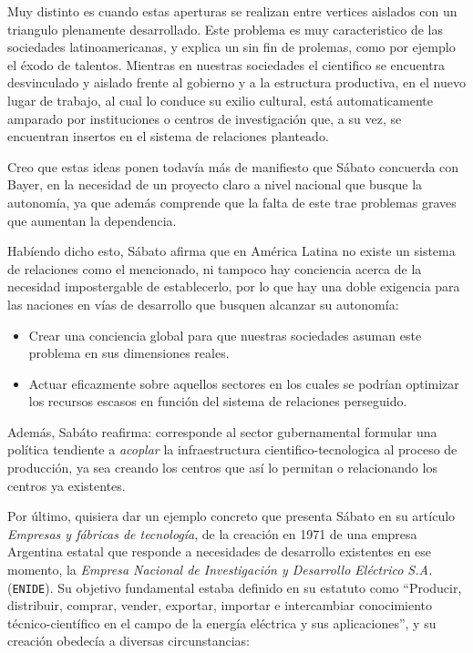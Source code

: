 Muy distinto es cuando estas aperturas se realizan entre vertices aislados con un triangulo plenamente desarrollado. Este problema es muy caracteristico de las sociedades latinoamericanas, y explica un sin fin de prolemas, como por ejemplo el éxodo de talentos. Mientras en nuestras sociedades el cientifico se encuentra desvinculado y aislado frente al gobierno y a la estructura productiva, en el nuevo lugar de trabajo, al cual lo conduce su exilio cultural, está automaticamente amparado por instituciones o centros de investigación que, a su vez, se encuentran insertos en el sistema de relaciones planteado.

Creo que estas ideas ponen todavía más de manifiesto que Sábato concuerda con Bayer, en la necesidad de un proyecto claro a nivel nacional que busque la autonomía, ya que además comprende que la falta de este trae problemas graves que aumentan la dependencia.

\vspace{0.5em}

Habíendo dicho esto, Sábato afirma que en América Latina no existe un sistema de relaciones como el mencionado, ni tampoco hay conciencia acerca de la necesidad impostergable de establecerlo, por lo que hay una doble exigencia para las naciones en vías de desarrollo que busquen alcanzar su autonomía:
\begin{itemize}
    \item Crear una conciencia global para que nuestras sociedades asuman este problema en sus dimensiones reales.
    \item Actuar eficazmente sobre aquellos sectores en los cuales se podrían optimizar los recursos escasos en función del sistema de relaciones perseguido.
\end{itemize}

Además, Sabáto reafirma: corresponde al sector gubernamental formular una política tendiente a \textit{acoplar} la infraestructura cientifico-tecnologica al proceso de producción, ya sea creando los centros que así lo permitan o relacionando los centros ya existentes.

\vspace{0.5em}

Por último, quisiera dar un ejemplo concreto que presenta Sábato en su artículo \textit{Empresas y fábricas de tecnología}, de la creación en 1971 de una empresa Argentina estatal que responde a necesidades de desarrollo existentes en ese momento, la \textit{Empresa Nacional de Investigación y Desarrollo Eléctrico S.A.} (\texttt{ENIDE}). Su objetivo fundamental estaba definido en su estatuto como ``Producir, distribuir, comprar, vender, exportar, importar e intercambiar conocimiento técnico-científico en el campo de la energía eléctrica y sus aplicaciones'', y su creación obedecía a diversas circunstancias:

